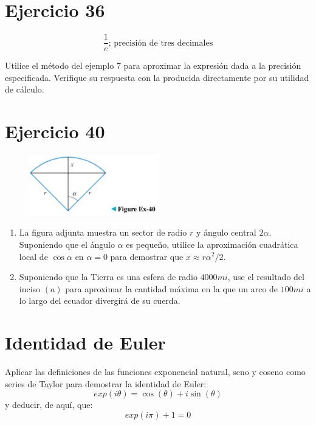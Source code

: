 \documentclass[12pt]{article}
\begin{document}
\section{Ejercicio 36}

\[\frac{1}{e}\text{; precisión de tres decimales}\]

Utilice el método del ejemplo 7 para aproximar la expresión dada a la precisión especificada. Verifique su respuesta con la producida directamente por su utilidad de cálculo.

\section{Ejercicio 40}

\begin{figure}[h!]
\centering
\includegraphics[width=0.5\textwidth]{../img/img_Lista2/2_40.png}
\end{figure}
\begin{enumerate}[label=(\alph*)]
\item La figura adjunta muestra un sector de radio $r$ y ángulo central $2 \alpha$. Suponiendo que el ángulo $\alpha$ es pequeño, utilice la aproximación cuadrática local de $\cos \alpha$ en $\alpha = 0$ para demostrar que $x \approx r \alpha ^2/2$.
\item Suponiendo que la Tierra es una esfera de radio $4000 mi$, use el resultado del inciso $(a)$ para aproximar la cantidad máxima en la que un arco de $100 mi$ a lo largo del ecuador divergirá de su cuerda.
\end{enumerate}

\section{Identidad de Euler}

Aplicar las definiciones de las funciones exponencial natural, seno y coseno como series de Taylor para demostrar la identidad de Euler:
\[exp(i\theta) = \cos(\theta) + i \sin(\theta)\]
y deducir, de aquí, que:
\[exp(i\pi) + 1 = 0\]
\end{document}

